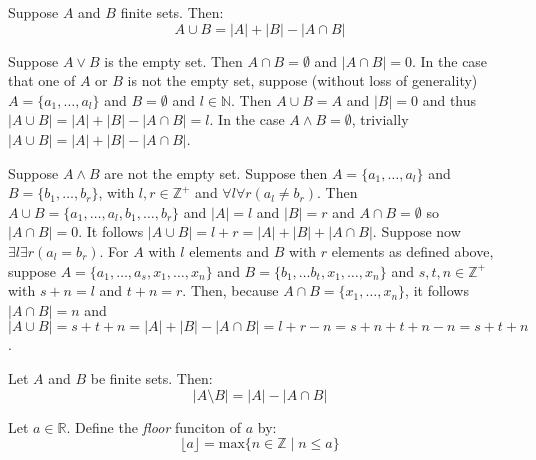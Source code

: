 \documentclass[nobib,notoc]{tufte-handout}
\begin{document}
\begin{thm}
	Suppose \(A\) and \(B\) finite sets. Then:
	\begin{equation*}
		A\cup B=\lvert A\rvert+\lvert B\rvert-\lvert A\cap B\rvert
	\end{equation*}
	\begin{IEEEproof}
		Suppose \(A\vee B\) is the empty set. Then \(A\cap B=\emptyset\) and \(\lvert A\cap B\rvert=0\). In the case that one of \(A\) or \(B\) is not the empty set, suppose (without loss of generality) \(A=\{a_1,\ldots,a_l\}\) and \(B=\emptyset\) and \(l\in\mathbb{N}\). Then \(A\cup B=A\) and \(\lvert B\rvert=0\) and thus \(\lvert A\cup B\rvert=\lvert A\rvert+\lvert B\rvert-\lvert A\cap B\rvert=l\). In the case \(A\wedge B=\emptyset\), trivially \(\lvert A\cup B\rvert=\lvert A\rvert +\lvert B\rvert -\lvert A\cap B\rvert\).\par
		Suppose \(A\wedge B\) are not the empty set. Suppose then \(A=\{a_1,\ldots, a_l\}\) and \(B=\{b_1,\ldots, b_r\}\), with \(l,r\in\mathbb{Z^+}\) and \(\forall l\forall r(a_l\neq b_r)\). Then \(A\cup B=\{a_1,\ldots, a_l,b_1,\ldots, b_r\}\) and \(\lvert A\rvert=l\) and \(\lvert B\rvert=r\) and \(A\cap B=\emptyset\) so \(\lvert A\cap B\rvert=0\). It follows \(\lvert A\cup B\rvert=l+r=\lvert A\rvert+\lvert B\rvert+\lvert A\cap B\rvert\). Suppose now \(\exists l\exists r(a_l=b_r)\). For \(A\) with \(l\) elements and \(B\) with \(r\) elements as defined above, suppose \(A=\{a_1,\ldots, a_s,x_1,\ldots, x_n\}\) and \(B=\{b_1,\ldots b_t,x_1,\ldots, x_n\}\) and \(s,t,n\in\mathbb{Z^{+}}\) with \(s+n=l\) and \(t+n=r\). Then, because \(A\cap B=\{x_1,\ldots,x_n\}\), it follows \(\lvert A\cap B\rvert=n\) and \(\lvert A\cup B\rvert=s+t+n=\lvert A\rvert+\lvert B\rvert-\lvert A\cap B\rvert=l+r-n=s+n+t+n-n=s+t+n\).
	\end{IEEEproof}
\end{thm}
\begin{cor}
	Let \(A\) and \(B\) be finite sets. Then:
	\begin{equation*}
		\lvert A\setminus B\rvert=\lvert A\rvert-\lvert A\cap B\rvert
	\end{equation*}
\end{cor}
\begin{defi}
	Let \(a\in\mathbb{R}\). Define the \emph{floor} funciton of \(a\) by:
	\begin{equation*}
		\lfloor a\rfloor=\text{max}\{n\in\mathbb{Z}\mid n\leq a\}
	\end{equation*}
\end{defi}
\end{document}
